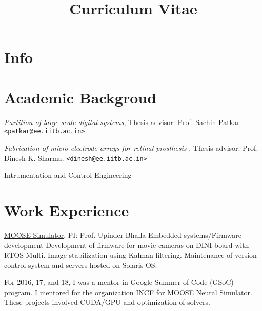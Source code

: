 \documentclass[11pt,a4paper, colorlinks=true, linkcolor=cyan]{moderncv}
\title{Curriculum Vitae}
\begin{document}
\maketitle

\vspace{0mm}

\section{Info}

\vspace{0mm}


\section{Academic Backgroud} 

{\emph{Partition of large scale digital systems}, Thesis advisor: Prof. Sachin
Patkar \texttt{<patkar@ee.iitb.ac.in>}
}

{\emph{Fabrication of micro-electrode arrays for retinal prosthesis}
, Thesis advisor: Prof. Dinesh K. Sharma. \texttt{<dinesh@ee.iitb.ac.in>}}

  {Intrumentation and Control Engineering }


\section{Work Experience}
{}{}{
    \href{https://github.com/BhallaLab/moose}{MOOSE Simulator}, PI: Prof. Upinder Bhalla
}
{}{}{Embedded systems/Firmware development
Development of firmware for movie-cameras on DINI board with RTOS Multi. Image
stabilization using Kalman filtering. Maintenance of version control system and
servers hosted on Solaris OS.}

{}{}{For 2016, 17, and 18, I was a mentor in Google Summer of Code (GSoC)
    program. I mentored for the organization \href{https://incf.org}{INCF} for
    \href{https://moose.ncbs.res.in}{MOOSE Neural Simulator}. These projects
    involved CUDA/GPU and optimization of solvers.
}
\end{document}
